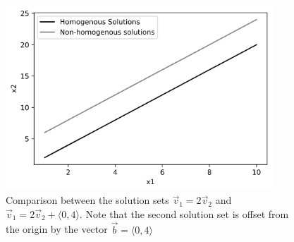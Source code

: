 \documentclass[11pt, a4paper]{article}
\begin{document}
\begin{figure}[h]
  \centerline{\includegraphics[width=10cm]{images/Solution_sets.png}}
  \caption{Comparison between the solution sets $\vec{v}_1 = 2\vec{v}_2$ and $\vec{v}_1 = 2\vec{v}_2 + \langle 0, 4 \rangle$.
  Note that the second solution set is offset from the origin by the vector $\vec{b} = \langle 0, 4 \rangle$}
\end{figure}
\end{document}
